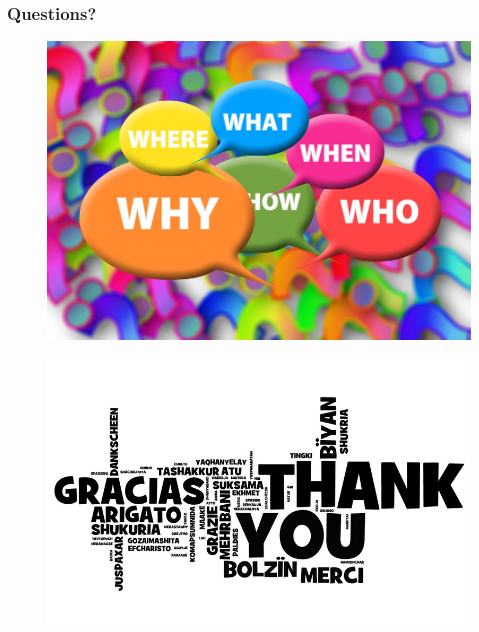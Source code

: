 \documentclass[aspectratio=169]{beamer}
\begin{document}
\begin{frame}
  \frametitle{Questions?}
  \begin{figure}
    \includegraphics[height=.7\textheight]{./img/010_-_questions.jpg}
  \end{figure}
\end{frame}

\begin{frame}
  \begin{figure}
    \includegraphics[height=.7\textheight]{./img/011_-_thanks.jpg}
  \end{figure}
\end{frame}

\end{document}
